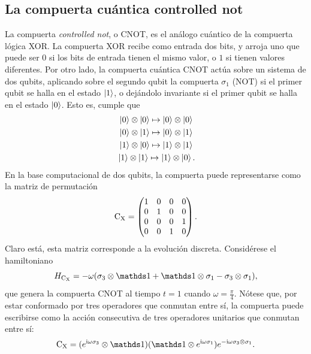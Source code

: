 \subsection{La compuerta cuántica controlled not}

La compuerta \textit{controlled not}, o CNOT, es el análogo cuántico de la compuerta lógica XOR. La compuerta XOR recibe como entrada dos bits, y arroja uno que puede ser $0$ si los bits de entrada tienen el mismo valor, o $1$ si tienen valores diferentes. Por otro lado, la compuerta cuántica CNOT actúa sobre un sistema de dos qubits, aplicando sobre el segundo qubit la compuerta $\sigma_{1}$ (NOT) si el primer qubit se halla en el estado $\ket{1}$, o dejándolo invariante si el primer qubit se halla en el estado $\ket{0}$. Esto es, cumple que \cite{Chuang}
\begin{align}
    \ket{0}\otimes\ket{0}\mapsto\ket{0}\otimes\ket{0}\nonumber\\
    \ket{0}\otimes\ket{1}\mapsto\ket{0}\otimes\ket{1}\nonumber\\
    \ket{1}\otimes\ket{0}\mapsto\ket{1}\otimes\ket{1}\nonumber\\
    \ket{1}\otimes\ket{1}\mapsto\ket{1}\otimes\ket{0} \rlap{.}\nonumber
\end{align}
En la base computacional de dos qubits, la compuerta puede representarse como la matriz de permutación
\begin{equation}
    \text{C}_{\text{X}}=\begin{pmatrix}
        1&0&0&0\\
        0&1&0&0\\
        0&0&0&1\\
        0&0&1&0
    \end{pmatrix}.\nonumber
\end{equation}
Claro está, esta matriz corresponde a la evolución discreta. Considérese el hamiltoniano
\begin{equation}\label{eq:CNOTHam}
  H_{\cnot}=-\omega(\pauli{3}\otimes\Id+\Id\otimes\pauli{1}-\pauli{3}\otimes\pauli{1}),
\end{equation}
que genera la compuerta CNOT al tiempo $t=1$ cuando $\omega=\frac{\pi}{4}$. Nótese que, por estar conformado por tres operadores que conmutan entre sí, la compuerta puede escribirse como la acción consecutiva de tres operadores unitarios que conmutan entre sí:
\begin{equation}
  \cnot=(e^{\rmi\omega\pauli{3}}\otimes \Id) (\Id \otimes e^{\rmi\omega\pauli{1}}) e^{-\rmi\omega\pauli{3}\otimes\pauli{1}}.\nonumber
\end{equation}

